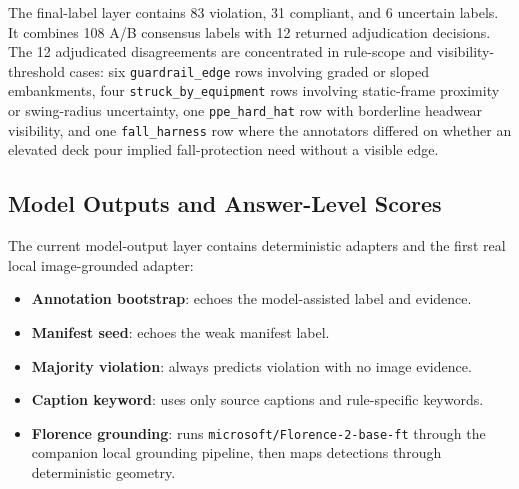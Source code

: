The final-label layer contains 83 violation, 31 compliant, and 6 uncertain labels. It combines 108 A/B consensus labels with 12 returned adjudication decisions. The 12 adjudicated disagreements are concentrated in rule-scope and visibility-threshold cases: six \texttt{guardrail\_edge} rows involving graded or sloped embankments, four \texttt{struck\_by\_equipment} rows involving static-frame proximity or swing-radius uncertainty, one \texttt{ppe\_hard\_hat} row with borderline headwear visibility, and one \texttt{fall\_harness} row where the annotators differed on whether an elevated deck pour implied fall-protection need without a visible edge.

\begin{table}[h]
\centering
\caption{Audit-final answer scores against the 120-row final-label layer.}

\end{table}

\subsection{Model Outputs and Answer-Level Scores}

The current model-output layer contains deterministic adapters and the first real local image-grounded adapter:

\begin{itemize}
\item \textbf{Annotation bootstrap}: echoes the model-assisted label and evidence.
\item \textbf{Manifest seed}: echoes the weak manifest label.
\item \textbf{Majority violation}: always predicts violation with no image evidence.
\item \textbf{Caption keyword}: uses only source captions and rule-specific keywords.
\item \textbf{Florence grounding}: runs \texttt{microsoft/Florence-2-base-ft} through the companion local grounding pipeline, then maps detections through deterministic geometry.
\end{itemize}

\begin{table}[h]
\centering
\caption{Pilot model-output scores against model-assisted bootstrap labels.}

\end{table}

\begin{table}[h]
\centering
\caption{Scale-up model-output scores against model-assisted bootstrap labels.}

\end{table}

